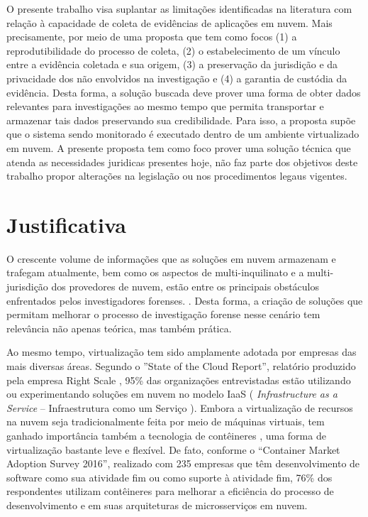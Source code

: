 %
O presente trabalho visa suplantar as limitações identificadas na literatura com relação à capacidade de coleta de evidências de aplicações em nuvem.
%
Mais precisamente, por meio de uma proposta que tem como focos (1) a reprodutibilidade do processo de coleta, (2) o estabelecimento de um vínculo entre a evidência coletada e sua origem, (3) a preservação da jurisdição e da privacidade dos não envolvidos na investigação e (4) a garantia de custódia da evidência.
%
Desta forma, a solução buscada deve prover uma forma de obter dados relevantes para investigações ao mesmo tempo que permita transportar e armazenar tais dados preservando sua credibilidade.
%
Para isso, a proposta supõe que o sistema sendo monitorado é executado dentro de um ambiente virtualizado em nuvem.
%
%
A presente proposta tem como foco prover uma solução técnica que atenda as necessidades juridicas presentes hoje, não faz parte dos objetivos deste trabalho propor alterações na legislação ou nos procedimentos legaus vigentes.


\section{Justificativa}
\label{sec:intro-justificativa}

O crescente volume de informações que as soluções em nuvem armazenam e trafegam atualmente, bem como os aspectos de multi-inquilinato e a multi-jurisdição dos provedores de nuvem, estão entre os principais obstáculos enfrentados pelos investigadores forenses. \cite{QuickIncreaseVolumeImpact:2014} \cite{BashAdvInForensics:2015}.
%
Desta forma, a criação de soluções que permitam melhorar o processo de investigação forense nesse cenário tem relevância não apenas teórica, mas também prática.


Ao mesmo tempo, virtualização tem sido amplamente adotada por empresas das mais diversas áreas. 
%
Segundo o ''State of the Cloud Report'', relatório produzido pela empresa Right Scale \cite{RightScale2017}, 95\% das organizações entrevistadas estão utilizando ou experimentando soluções em nuvem no modelo IaaS ( \textit{Infrastructure as a Service} -- Infraestrutura como um Serviço ).
%
Embora a virtualização de recursos na nuvem seja tradicionalmente feita por meio de máquinas virtuais, tem ganhado importância também a tecnologia de contêineres \cite{containers-tech:2014}, uma forma de virtualização bastante leve e flexível.
%
De fato, conforme o ``Container Market Adoption Survey 2016'', realizado com 235 empresas que têm desenvolvimento de software como sua atividade fim ou como suporte à atividade fim, 76\% dos respondentes utilizam contêineres para melhorar a eficiência do processo de desenvolvimento e em suas arquiteturas de microsserviços em nuvem.
%


